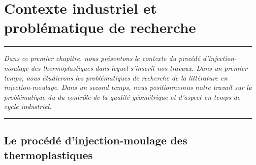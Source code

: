 
\lhead[\fancyplain{}{\leftmark}]%
      {\fancyplain{}{}} %
\chead[\fancyplain{}{}]%
      {\fancyplain{}{}}
\rhead[\fancyplain{}{}]%
      {\fancyplain{}{\rightmark}}%
\lfoot[\fancyplain{}{}]%
      {\fancyplain{}{}}
\cfoot[\fancyplain{}{\thepage}]%
      {\fancyplain{}{\thepage}} %
\rfoot[\fancyplain{}{}]%
     {\fancyplain{}{\scriptsize}}



\chapter{Contexte industriel et problématique de recherche}
\label{ch:objectives}


\begin{center}
\rule{0.7\linewidth}{.5pt}
\begin{minipage}{0.7\linewidth}
\smallskip

\textit{
Dans ce premier chapitre, nous présentons le contexte du procédé d'injection-moulage des thermoplastiques dans lequel s'inscrit nos travaux.
Dans un premier temps, nous étudierons les problématiques de recherche de la littérature en injection-moulage.
Dans un second temps, nous positionnerons notre travail sur la problématique du  du contrôle de la qualité géométrique et d'aspect en temps de cycle industriel.
}

\end{minipage}
\smallskip
\rule{0.7\linewidth}{.5pt}
\end{center}

\minitoc
\newpage

\section{Le procédé d'injection-moulage des thermoplastiques}  \label{sec:molding_presentation}

